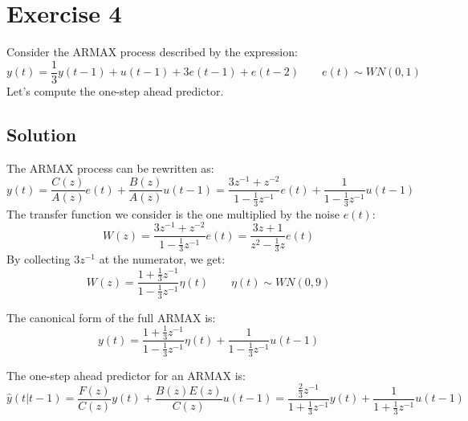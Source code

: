 \section{Exercise 4}

Consider the ARMAX process described by the expression:
\[y(t)=\dfrac{1}{3}y(t-1)+u(t-1)+3e(t-1)+e(t-2)\qquad e(t)\sim WN(0,1)\]
Let's compute the one-step ahead predictor.

\subsection*{Solution}
The ARMAX process can be rewritten as:
\[y(t)=\dfrac{C(z)}{A(z)}e(t)+\dfrac{B(z)}{A(z)}u(t-1)=\dfrac{3z^{-1}+z^{-2}}{1-\frac{1}{3}z^{-1}}e(t)+\dfrac{1}{1-\frac{1}{3}z^{-1}}u(t-1)\]
The transfer function we consider is the one multiplied by the noise $e(t)$: 
\[W(z)=\dfrac{3z^{-1}+z^{-2}}{1-\frac{1}{3}z^{-1}}e(t)=\dfrac{3z+1}{z^2-\frac{1}{3}z}e(t)\]
By collecting $3z^{-1}$ at the numerator, we get:
\[W(z)=\dfrac{1+\frac{1}{3}z^{-1}}{1-\frac{1}{3}z^{-1}}\eta(t)\qquad \eta(t)\sim WN(0,9)\]

The canonical form of the full ARMAX is:
\[y(t)=\dfrac{1+\frac{1}{3}z^{-1}}{1-\frac{1}{3}z^{-1}}\eta(t)+\dfrac{1}{1-\frac{1}{3}z^{-1}}u(t-1)\]

The one-step ahead predictor for an ARMAX is:
\[\hat{y}(t|t-1)=\dfrac{F(z)}{C(z)}y(t)+\dfrac{B(z)E(z)}{C(z)}u(t-1)=\dfrac{\frac{2}{3}z^{-1}}{1+\frac{1}{3}z^{-1}}y(t)+\dfrac{1}{1+\frac{1}{3}z^{-1}}u(t-1)\]